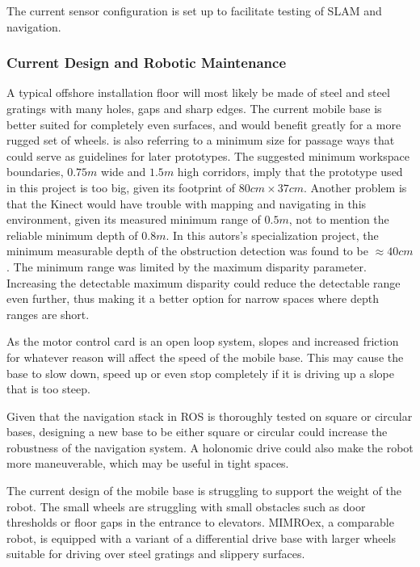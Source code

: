 The current sensor configuration is set up to facilitate testing of \ac{SLAM} and navigation.

\subsubsection{Current Design and Robotic Maintenance}
\label{sec:design_maintenance}
A typical offshore installation floor will most likely be made of steel and steel gratings with many holes, gaps and sharp edges\cite{graf2008mobile}. The current mobile base is better suited for completely even surfaces, and would benefit greatly for a more rugged set of wheels. \cite{graf2008mobile} is also referring to a minimum size for passage ways that could serve as guidelines for later prototypes. The suggested minimum workspace boundaries, $0.75m$ wide and $1.5m$ high corridors, imply that the prototype used in this project is too big, given its footprint of $80cm \times 37 cm$. Another problem is that the Kinect would have trouble with mapping and navigating in this environment, given its measured minimum range of $0.5m$, not to mention the reliable minimum depth of $0.8m$. In this autors's specialization project\cite{lindrup}, the minimum measurable depth of the obstruction detection was found to be $\approx 40 cm$. The minimum range was limited by the maximum disparity parameter. Increasing the detectable maximum disparity could reduce the detectable range even further, thus making it a better option for narrow spaces where depth ranges are short. 

As the motor control card is an open loop system, slopes and increased friction for whatever reason will affect the speed of the mobile base. This may cause the base to slow down, speed up or even stop completely if it is driving up a slope that is too steep.

Given that the navigation stack in \ac{ROS} is thoroughly tested on square or circular bases, designing a new base to be either square or circular could increase the robustness of the navigation system. A holonomic drive could also make the robot more maneuverable, which may be useful in tight spaces.

The current design of the mobile base is struggling to support the weight of the robot. The small wheels are struggling with small obstacles such as door thresholds or floor gaps in the entrance to elevators. \ac{MIMROex}, a comparable robot, is equipped with a variant of a differential drive base with larger wheels suitable for driving over steel gratings and slippery surfaces.



